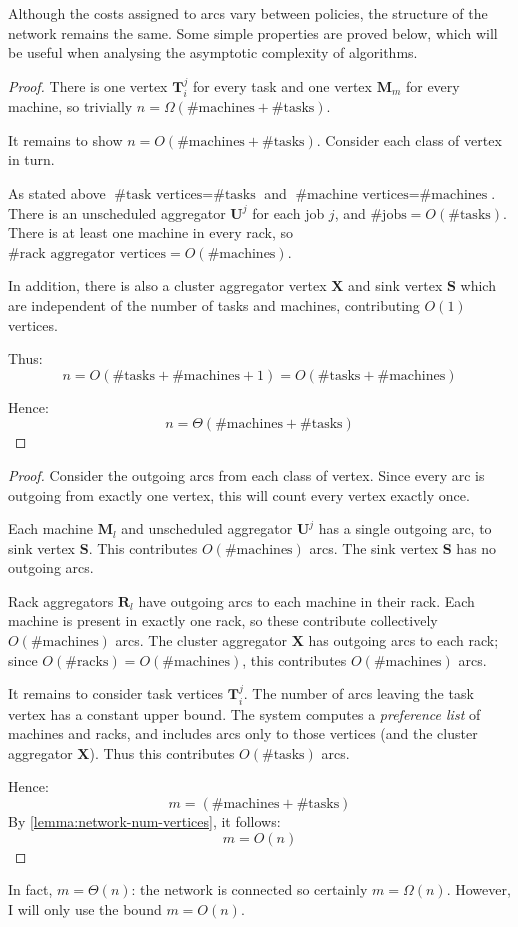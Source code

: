 Although the costs assigned to arcs vary between policies, the structure of the network remains the same. Some simple properties are proved below, which will be useful when analysing the asymptotic complexity of algorithms.

\flowschedulingnumvertices*
\begin{proof}
There is one vertex $\mathbf{T}_i^j$ for every task and one vertex $\mathbf{M}_m$ for every machine, so trivially $n = \Omega\left(\text{\# machines} + \text{\# tasks}\right)$.

It remains to show $n = O\left(\text{\# machines} + \text{\# tasks}\right)$. Consider each class of vertex in turn.

As stated above $\text{\# task vertices} = \text{\# tasks}$ and $\text{\# machine vertices} = \text{\# machines}$. There is an unscheduled aggregator $\mathbf{U}^j$ for each job $j$, and $\text{\# jobs} = O\left(\text{\# tasks}\right)$. There is at least one machine in every rack, so $\text{\# rack aggregator vertices} = O\left(\text{\# machines}\right)$. 

In addition, there is also a cluster aggregator vertex $\mathbf{X}$ and sink vertex $\mathbf{S}$ which are independent of the number of tasks and machines, contributing $O(1)$ vertices.

Thus:
\[n = O\left(\text{\# tasks} + \text{\# machines} + 1\right) = O\left(\text{\# tasks} + \text{\# machines}\right)\]

Hence:
\[n = \Theta\left(\text{\# machines} + \text{\# tasks}\right)\]
\end{proof}

\flowschedulingnumarcs*
\begin{proof}
Consider the outgoing arcs from each class of vertex. Since every arc is outgoing from exactly one vertex, this will count every vertex exactly once.

Each machine $\mathbf{M}_l$ and unscheduled aggregator $\mathbf{U}^j$ has a single outgoing arc, to sink vertex $\mathbf{S}$. This contributes $O\left(\text{\# machines}\right)$ arcs. The sink vertex $\mathbf{S}$ has no outgoing arcs.

Rack aggregators $\mathbf{R}_l$ have outgoing arcs to each machine in their rack. Each machine is present in exactly one rack, so these contribute collectively $O\left(\text{\# machines}\right)$ arcs. The cluster aggregator $\mathbf{X}$ has outgoing arcs to each rack; since $O\left(\text{\# racks}\right) = O\left(\text{\# machines}\right)$, this contributes $O\left(\text{\# machines}\right)$ arcs.

It remains to consider task vertices $\mathbf{T}_i^j$. The number of arcs leaving the task vertex has a constant upper bound. The system computes a \emph{preference list} of machines and racks, and includes arcs only to those vertices (and the cluster aggregator $\mathbf{X}$). Thus this contributes $O\left(\text{\# tasks}\right)$ arcs.

Hence:
\[m = \left(\text{\# machines} + \text{\# tasks}\right)\]
By \cref{lemma:network-num-vertices}, it follows:
\[m = O(n)\]
\end{proof}

\begin{remark}
In fact, $m = \Theta(n)$: the network is connected so certainly $m = \Omega(n)$. However, I will only use the bound $m = O(n)$.
\end{remark}